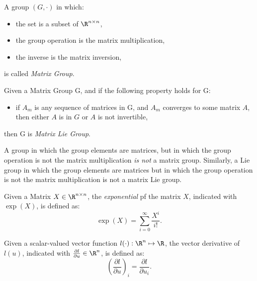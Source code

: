 \begin{definition}
A group $(G,\cdot)$ in which:
\begin{itemize}
 \item the set is a subset of $\R^{n \times n}$,
 \item the group operation is the matrix multiplication,
 \item the inverse is the matrix inversion,
\end{itemize}
is called \emph{Matrix Group}.
\end{definition}

\begin{definition}
Given a Matrix Group G, and if the following property holds for G:
\begin{itemize}
    \item if $A_m$ is any sequence of matrices in G, and $A_m$ converges to some matrix $A$, then either $A$ is in $G$ or $A$ is not invertible,
\end{itemize}
then G is \emph{Matrix Lie Group}.
\end{definition}

\begin{remark}
A group in which the group elements are matrices, but in which the group operation is not the matrix multiplication \emph{is not} a matrix group. Similarly, a Lie group in which the group elements are matrices but in which the group operation is not the matrix multiplication is not a matrix Lie group. 
\end{remark}

\begin{definition}
Given a Matrix $X \in \R^{n \times n}$, the \emph{exponential} pf the matrix $X$, indicated with $\exp{(X)}$, is defined as:
\begin{equation}
\exp{(X)} = \sum_{i = 0}^{\infty} \frac{X^i}{i!} . 
\end{equation}
\end{definition}

\begin{definition}
Given a scalar-valued vector function $l(\cdot) : \R^{n} \mapsto \R$, the vector derivative of $l(u)$, indicated with $\frac{\partial l}{\partial u} \in \R^n$, is defined as:
\begin{equation}
\left( \frac{\partial l}{\partial u} \right)_{i} = 
\frac{\partial l}{\partial u_{i}}.
\end{equation}
\end{definition}

